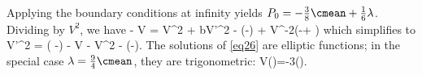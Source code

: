 \ee
Applying the boundary conditions at infinity yields 
$P_0=-\frac{3}{8}\cmean + \frac{1}{6}\lambda$.  Dividing by $V^2$, we have
\be
- V = V^2 + bV'^2 
    - \left(\lambda -\right) + V^{-2}\left(-\cmean + \lambda\right)
\ee
which simplifies to
\be \label{eq26}
V'^2 = \left(\frac{\lambda}{\cmean} -\right)
    - V - V^2 
    - \left(\frac{\lambda}{3\cmean}-\right).
\ee
The solutions of \eqref{eq26} are elliptic functions; in the special case
$\lambda=\frac{9}{4}\cmean$, they are trigonometric:
\be
V(\xi)=-3\sin\left(\right).
\ee



